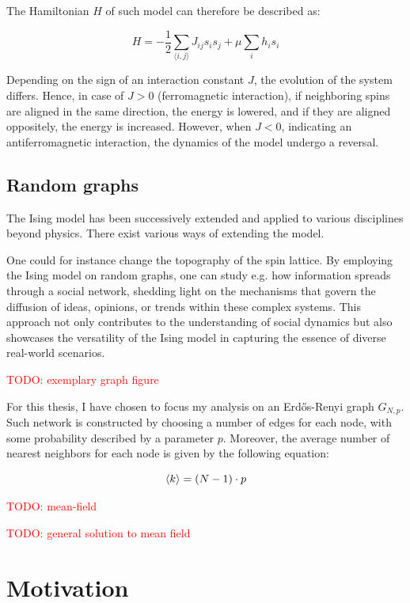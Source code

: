 \documentclass[11pt,a4paper]{article}
\newcommand{\todo}[1]{\textcolor{red}{TODO: #1}}
\begin{document}
The Hamiltonian $H$ of such model can therefore be described as:

\begin{equation}
    H = -\frac12\sum_{\langle i,j \rangle} J_{ij} s_i s_j + \mu\sum_i h_i s_i
\end{equation}

Depending on the sign of an interaction constant $J$, the evolution of the system differs. Hence, in case of $J>0$ (ferromagnetic interaction), if neighboring spins are aligned in the same direction, the energy is lowered, and if they are aligned oppositely, the energy is increased. However, when $J<0$, indicating  an antiferromagnetic interaction, the dynamics of the model undergo a reversal.


\subsection{Random graphs}

The Ising model has been successively extended and applied to various disciplines beyond physics. There exist various ways of extending the model.

One could for instance change the topography of the spin lattice. By employing the Ising model on random graphs, one can study e.g. how information spreads through a social network, shedding light on the mechanisms that govern the diffusion of ideas, opinions, or trends within these complex systems. This approach not only contributes to the understanding of social dynamics but also showcases the versatility of the Ising model in capturing the essence of diverse real-world scenarios.

\todo{exemplary graph figure}

For this thesis, I have chosen to focus my analysis on an Erdős-Renyi graph $G_{N,p}$. Such network is constructed by choosing a number of edges for each node, with some probability described by a parameter $p$. Moreover, the average number of nearest neighbors for each node is given by the following equation:

\begin{equation}
    \braket{k} = (N-1) \cdot p
\end{equation}

\todo{mean-field}

\todo{general solution to mean field}

\section{Motivation}
\end{document}
